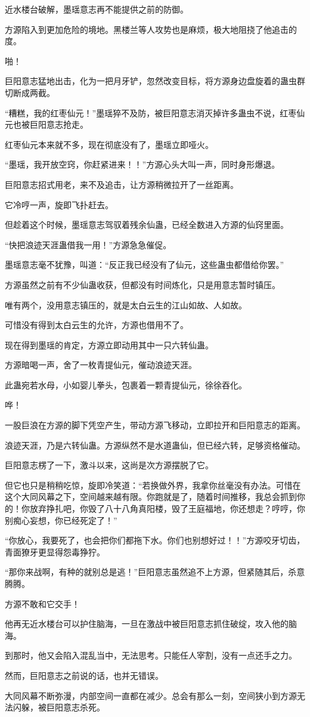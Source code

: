 \begin{this_body}
近水楼台破解，墨瑶意志再不能提供之前的防御。

方源陷入到更加危险的境地。黑楼兰等人攻势也是麻烦，极大地阻挠了他追击的度。

啪！

巨阳意志猛地出击，化为一把月牙铲，忽然改变目标，将方源身边盘旋着的蛊虫群切断成两截。

“糟糕，我的红枣仙元！”墨瑶猝不及防，被巨阳意志消灭掉许多蛊虫不说，红枣仙元也被巨阳意志抢走。

红枣仙元本来就不多，现在彻底没有了，墨瑶立即哑火。

“墨瑶，我开放空窍，你赶紧进来！！”方源心头大叫一声，同时身形爆退。

巨阳意志招式用老，来不及追击，让方源稍微拉开了一丝距离。

它冷哼一声，旋即飞扑赶去。

但趁着这个时候，墨瑶意志驾驭着残余仙蛊，已经全数进入方源的仙窍里面。

“快把浪迹天涯蛊借我一用！”方源急急催促。

墨瑶意志毫不犹豫，叫道：“反正我已经没有了仙元，这些蛊虫都借给你罢。”

方源虽然之前有不少仙蛊收获，但都没有时间炼化，只是用意志暂时镇压。

唯有两个，没用意志镇压的，就是太白云生的江山如故、人如故。

可惜没有得到太白云生的允许，方源也借用不了。

现在得到墨瑶的肯定，方源立即动用其中一只六转仙蛊。

方源暗喝一声，舍了一枚青提仙元，催动浪迹天涯。

此蛊宛若水母，小如婴儿拳头，包裹着一颗青提仙元，徐徐吞化。

哗！

一股巨浪在方源的脚下凭空产生，带动方源飞移动，立即拉开和巨阳意志的距离。

浪迹天涯，乃是六转仙蛊。方源纵然不是水道蛊仙，但已经六转，足够资格催动。

巨阳意志楞了一下，激斗以来，这尚是次方源摆脱了它。

但它也只是稍稍吃惊，旋即冷笑道：“若换做外界，我拿你丝毫没有办法。可惜在这个大同风幕之下，空间越来越有限。你跑就是了，随着时间推移，我总会抓到你的！你放弃挣扎吧，你毁了八十八角真阳楼，毁了王庭福地，你还想走？哼哼，你别痴心妄想，你已经死定了！”

“你放心，我要死了，也会把你们都拖下水。你们也别想好过！！”方源咬牙切齿，青面獠牙更显得怨毒狰狞。

“那你来战啊，有种的就别总是逃！”巨阳意志虽然追不上方源，但紧随其后，杀意腾腾。

方源不敢和它交手！

他再无近水楼台可以护住脑海，一旦在激战中被巨阳意志抓住破绽，攻入他的脑海。

到那时，他又会陷入混乱当中，无法思考。只能任人宰割，没有一点还手之力。

然而，巨阳意志之前说的话，也并无错误。

大同风幕不断弥漫，内部空间一直都在减少。总会有那么一刻，空间狭小到方源无法闪躲，被巨阳意志杀死。

\end{this_body}

